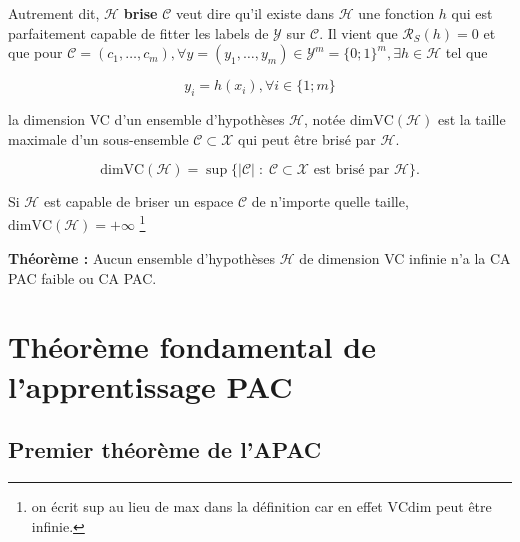 \begin{itemize}
    \noindent Autrement dit, $\mathcal{H}$ \textbf{brise} $\mathcal{C}$ veut dire qu'il existe dans $\mathcal{H}$ une fonction $h$ qui est parfaitement capable de fitter les labels
    de $\mathcal{Y}$ sur $\mathcal{C}$. Il vient que $\mathcal{R}_S(h) = 0$ et que pour $\mathcal{C} = (c_1, \dots, c_m), \forall y = (y_1, \dots, y_m) \in \mathcal{Y}^{m} = \{0;1\}^{m},
    \exists h \in \mathcal{H}$ tel que 

    \begin{equation}
        y_i = h(x_i), \forall i \in \{1;m\}
    \end{equation}

\end{itemize}

\noindent la dimension VC d'un ensemble d'hypothèses $\mathcal{H}$, notée $\mathrm{dimVC}(\mathcal{H})$ est la taille maximale d'un sous-ensemble
$\mathcal{C} \subset \mathcal{X}$ qui peut être brisé par $\mathcal{H}$.

\begin{equation}
    \mathrm{dimVC}(\mathcal{H}) = \sup \{ |\mathcal{C}| \; : \; \mathcal{C} \subset \mathcal{X} \text{ est brisé par } \mathcal{H} \}.
\end{equation}

\noindent Si $\mathcal{H}$ est capable de briser un espace $\mathcal{C}$ de n'importe quelle taille, $\mathrm{dimVC}(\mathcal{H}) = +\infty$ \footnote{
    on écrit sup au lieu de max dans la définition car en effet $\mathrm{VCdim}$ peut être infinie.
}

\noindent \textbf{Théorème : } Aucun ensemble d'hypothèses $\mathcal{H}$ de dimension VC infinie n'a la CA PAC faible ou CA PAC.

\section{Théorème fondamental de l'apprentissage PAC}
\subsection{Premier théorème de l'APAC}

 